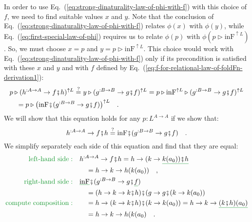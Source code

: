 In order to use Eq.~(\ref{eq:strong-dinaturality-law-of-phi-with-f})
with this choice of $f$, we need to find suitable values $x$ and
$y$. Note that the conclusion of Eq.~(\ref{eq:strong-dinaturality-law-of-phi-with-f})
relates $\phi(x)$ with $\phi(y)$, while Eq.~(\ref{eq:first-special-law-of-phi})
requires us to relate $\phi(p)$ with $\phi(p\triangleright\text{inF}^{\uparrow L})$.
So, we must choose $x=p$ and $y=p\triangleright\text{inF}^{\uparrow L}$.
This choice would work with Eq.~(\ref{eq:strong-dinaturality-law-of-phi-with-f})
only if its precondition is satisfied with these $x$ and $y$ and
with $f$ defined by Eq.~(\ref{eq:f-for-relational-law-of-foldFn-derivation1}):
\begin{align*}
 & p\triangleright(h^{:A\rightarrow A}\rightarrow f\bef h)^{\uparrow L}\overset{?}{=}y\triangleright(g^{:B\rightarrow B}\rightarrow g\bef f)^{\uparrow L}=p\triangleright\text{inF}^{\uparrow L}\triangleright(g^{:B\rightarrow B}\rightarrow g\bef f)^{\uparrow L}\\
 & \quad=p\triangleright\big(\text{inF}\bef(g^{:B\rightarrow B}\rightarrow g\bef f)\big)^{\uparrow L}\quad.
\end{align*}
We will show that this equation holds for any $p:L^{A\rightarrow A}$
if we show that:
\[
h^{:A\rightarrow A}\rightarrow f\bef h\overset{?}{=}\text{inF}\bef(g^{:B\rightarrow B}\rightarrow g\bef f)\quad.
\]
We simplify separately each side of this equation and find that they
are equal:
\begin{align*}
{\color{greenunder}\text{left-hand side}:}\quad & h^{:A\rightarrow A}\rightarrow f\bef h=h\rightarrow(k\rightarrow\gunderline{k(a_{0}))\bef h}\\
 & \quad=h\rightarrow k\rightarrow h(k(a_{0}))\quad,\\
{\color{greenunder}\text{right-hand side}:}\quad & \gunderline{\text{inF}}\bef(g^{:B\rightarrow B}\rightarrow g\bef\gunderline f)\\
 & \quad=(h\rightarrow k\rightarrow k\bef h)\bef(g\rightarrow g\bef(k\rightarrow k(a_{0}))\\
{\color{greenunder}\text{compute composition}:}\quad & \quad=h\rightarrow(k\rightarrow k\bef h)\bef(k\rightarrow k(a_{0}))=h\rightarrow k\rightarrow\gunderline{(k\bef h)(a_{0})}\\
 & \quad=h\rightarrow k\rightarrow h(k(a_{0})\quad.
\end{align*}

